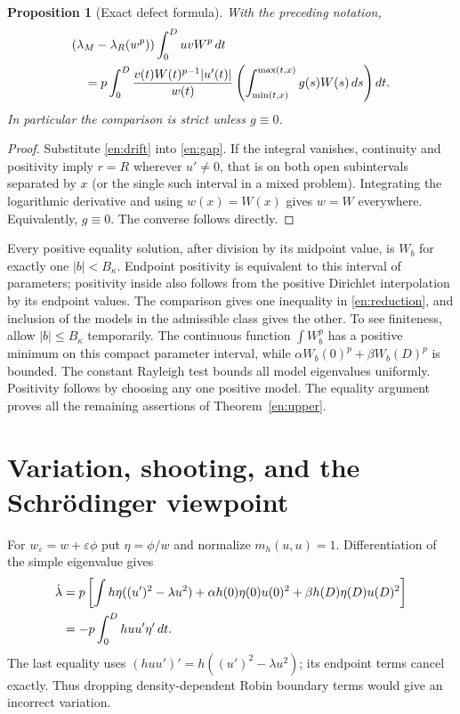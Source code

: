 \documentclass[12pt]{amsart}
\newtheorem{prop}[thm]{Proposition}
\theoremstyle{definition}
\theoremstyle{remark}
\numberwithin{equation}{section}
\begin{document}
\begin{prop}[Exact defect formula]\label{en:defect}
With the preceding notation,
\begin{align}\label{en:defectidentity}
 &(\lambda_M-\lambda_R(w^p))\int_0^DuvW^p\,dt\\
 &\quad=p\int_0^D\frac{v(t)W(t)^{p-1}|u'(t)|}{w(t)}
 \left(\int_{\min(t,x)}^{\max(t,x)}g(s)W(s)\,ds\right)dt.\notag
\end{align}
In particular the comparison is strict unless $g\equiv0$.
\end{prop}
\begin{proof}
Substitute \eqref{en:drift} into \eqref{en:gap}. If the integral vanishes, continuity and positivity imply $r=R$ wherever $u'\ne0$, that is on both open subintervals separated by $x$ (or the single such interval in a mixed problem). Integrating the logarithmic derivative and using $w(x)=W(x)$ gives $w=W$ everywhere. Equivalently, $g\equiv0$. The converse follows directly.
\end{proof}

Every positive equality solution, after division by its midpoint value, is $W_b$ for exactly one $|b|<B_\kappa$. Endpoint positivity is equivalent to this interval of parameters; positivity inside also follows from the positive Dirichlet interpolation by its endpoint values. The comparison gives one inequality in \eqref{en:reduction}, and inclusion of the models in the admissible class gives the other. To see finiteness, allow $|b|\le B_\kappa$ temporarily. The continuous function $\int W_b^p$ has a positive minimum on this compact parameter interval, while $\alpha W_b(0)^p+\beta W_b(D)^p$ is bounded. The constant Rayleigh test bounds all model eigenvalues uniformly. Positivity follows by choosing any one positive model. The equality argument proves all the remaining assertions of Theorem~\ref{en:upper}.

\section{Variation, shooting, and the Schr\"odinger viewpoint}
For $w_\varepsilon=w+\varepsilon\phi$ put $\eta=\phi/w$ and normalize $m_h(u,u)=1$. Differentiation of the simple eigenvalue gives
\begin{align}\label{en:firstvariation}
 \dot\lambda&=p\left[\int h\eta((u')^2-\lambda u^2)
 +\alpha h(0)\eta(0)u(0)^2+\beta h(D)\eta(D)u(D)^2\right]\\
 &=-p\int_0^D hu u'\eta'\,dt.\notag
\end{align}
The last equality uses $(huu')'=h((u')^2-\lambda u^2)$; its endpoint terms cancel exactly. Thus dropping density-dependent Robin boundary terms would give an incorrect variation.
\end{document}
